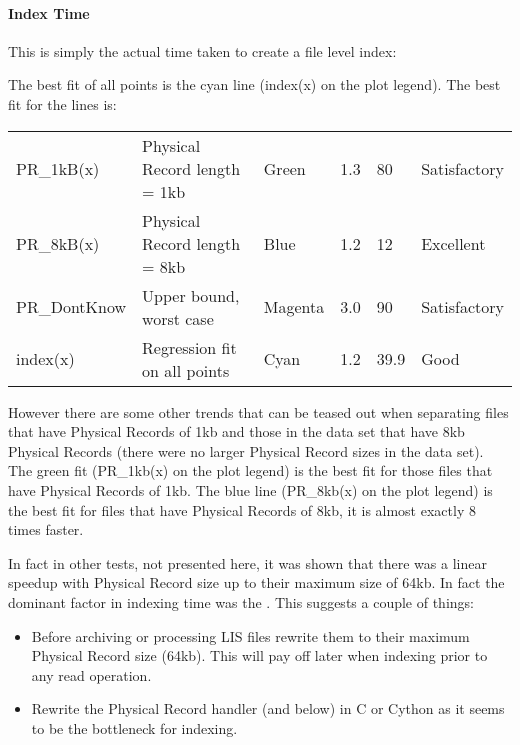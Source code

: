 \documentclass[letterpaper,10pt,english]{sphinxmanual}
\begin{document}
\paragraph{Index Time}
\label{\detokenize{tech/LIS_indexing:index-time}}
This is simply the actual time taken to create a file level index:

\noindent{}

The best fit of all points is the cyan line (index(x) on the plot legend). The best fit for the lines is:


\begin{savenotes}\sphinxattablestart
\centering
\begin{tabulary}{\linewidth}[t]{|T|T|T|T|T|T|}
\hline
{}\relax &\relax &\relax &\relax &\relax &\relax \\
\hline
PR\_1kB(x)
&
Physical Record length = 1kb
&
Green
&
1.3
&
80
&
Satisfactory
\\
\hline
PR\_8kB(x)
&
Physical Record length = 8kb
&
Blue
&
1.2
&
12
&
Excellent
\\
\hline
PR\_DontKnow
&
Upper bound, worst case
&
Magenta
&
3.0
&
90
&
Satisfactory
\\
\hline
index(x)
&
Regression fit on all points
&
Cyan
&
1.2
&
39.9
&
Good
\\
\hline
\end{tabulary}
\par
\sphinxattableend\end{savenotes}

However there are some other trends that can be teased out when separating files that have Physical Records of 1kb and those in the data set that have 8kb Physical Records (there were no larger Physical Record sizes in the data set). The green fit (PR\_1kb(x) on the plot legend) is the best fit for those files that have Physical Records of 1kb. The blue line (PR\_8kb(x) on the plot legend) is the best fit for files that have Physical Records of 8kb, it is almost exactly 8 times faster.

In fact in other tests, not presented here, it was shown that there was a linear speedup with Physical Record size up to their maximum size of 64kb. In fact the dominant factor in indexing time was the . This suggests a couple of things:
\begin{itemize}
\item {} 
Before archiving or processing LIS files rewrite them to their maximum Physical Record size (64kb). This will pay off later when indexing prior to any read operation.

\item {} 
Rewrite the Physical Record handler (and below) in C or Cython as it seems to be the bottleneck for indexing.

\end{itemize}
\end{document}
